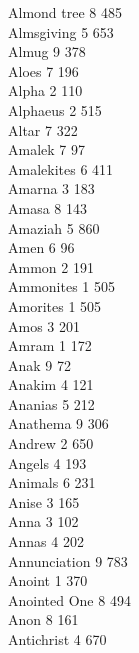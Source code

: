 Almond tree \hfill 8 \quad \phantom{0}485\\
Almsgiving \hfill 5 \quad \phantom{0}653\\
Almug \hfill 9 \quad \phantom{0}378\\
Aloes \hfill 7 \quad \phantom{0}196\\
Alpha \hfill 2 \quad \phantom{0}110\\
Alphaeus \hfill 2 \quad \phantom{0}515\\
Altar \hfill 7 \quad \phantom{0}322\\
Amalek \hfill 7 \quad \phantom{0}\phantom{0}97\\
Amalekites \hfill 6 \quad \phantom{0}411\\
Amarna \hfill 3 \quad \phantom{0}183\\
Amasa \hfill 8 \quad \phantom{0}143\\
Amaziah \hfill 5 \quad \phantom{0}860\\
Amen \hfill 6 \quad \phantom{0}\phantom{0}96\\
Ammon \hfill 2 \quad \phantom{0}191\\
Ammonites \hfill 1 \quad \phantom{0}505\\
Amorites \hfill 1 \quad \phantom{0}505\\
Amos \hfill 3 \quad \phantom{0}201\\
Amram \hfill 1 \quad \phantom{0}172\\
Anak \hfill 9 \quad \phantom{0}\phantom{0}72\\
Anakim \hfill 4 \quad \phantom{0}121\\
Ananias \hfill 5 \quad \phantom{0}212\\
Anathema \hfill 9 \quad \phantom{0}306\\
Andrew \hfill 2 \quad \phantom{0}650\\
Angels \hfill 4 \quad \phantom{0}193\\
Animals \hfill 6 \quad \phantom{0}231\\
Anise \hfill 3 \quad \phantom{0}165\\
Anna \hfill 3 \quad \phantom{0}102\\
Annas \hfill 4 \quad \phantom{0}202\\
Annunciation \hfill 9 \quad \phantom{0}783\\
Anoint \hfill 1 \quad \phantom{0}370\\
Anointed One \hfill 8 \quad \phantom{0}494\\
Anon \hfill 8 \quad \phantom{0}161\\
Antichrist \hfill 4 \quad \phantom{0}670\\
